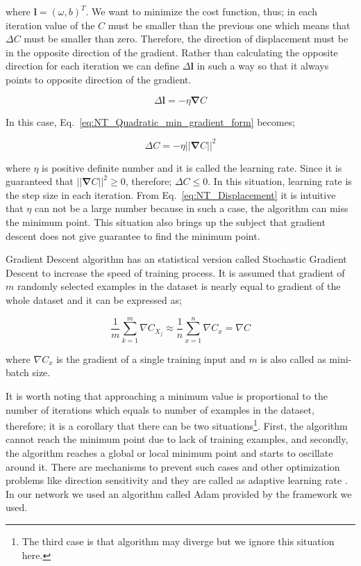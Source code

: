 \documentclass[a4paper,times,12pt]{article}
\begin{document}
\noindent where $\boldsymbol{l} = (\omega, b)^T$. We want to minimize the cost function, thus; in each iteration value of the $C$ must be smaller than the previous one which means that $\Delta{C}$ must be smaller than zero. Therefore, the direction of displacement must be in the opposite direction of the gradient. Rather than calculating the opposite direction for each iteration we can define $\Delta{\boldsymbol{l}}$ in such a way so that it always points to opposite direction of the gradient.

\begin{equation}
\label{eq:NT_learning_rate}
\Delta{\boldsymbol{l}} = -\eta\boldsymbol{\nabla}C
\end{equation}

\noindent In this case, Eq.~\eqref{eq:NT_Quadratic_min_gradient_form} becomes;

\begin{equation}
\label{eq:NT_Displacement}
\Delta{C} = -\eta ||\boldsymbol{\nabla}{C}||^2
\end{equation}

\noindent where $\eta$ is positive definite number and it is called the learning rate. Since it is guaranteed that $||\boldsymbol{\nabla}{C}||^2 \geq 0$, therefore; $\Delta{C} \leq 0$. In this situation, learning rate is the step size in each iteration. From Eq.~\eqref{eq:NT_Displacement} it is intuitive that $\eta$ can not be a large number because in such a case, the algorithm can miss the minimum point. This situation also brings up the subject that gradient descent does not give guarantee to find the minimum point.

Gradient Descent algorithm has an statistical version called Stochastic Gradient Descent to increase the speed of training process. It is assumed that gradient of  $m$ randomly selected examples in the dataset is nearly equal to gradient of the whole dataset and it can be expressed as;

\begin{equation}
\label{eq:NT_Stochastic}
\frac{1}{m} \sum\limits_{k = 1}^{m} \nabla{C_{X_j}} \approx \frac{1}{n}\sum\limits_{x = 1}^{n} \nabla{C_{x}} = \nabla{C}
\end{equation}

\noindent where $\nabla{C_x}$ is the gradient of a single training input and $m$ is also called as mini-batch size.

It is worth noting that approaching a minimum value is proportional to the number of iterations which equals to number of examples in the dataset, therefore; it is a corollary that there can be two situations\footnote{The third case is that algorithm may diverge but we ignore this situation here.}. First, the algorithm cannot reach the minimum point due to lack of training examples, and secondly, the algorithm reaches a global or local minimum point and starts to oscillate around it\cite{zeiler2012adadelta}. There are mechanisms to prevent such cases and other optimization problems like direction sensitivity and they are called as adaptive learning rate \cite{mills2017deep}. In our network we used an algorithm called Adam \cite{kingma2014adam} provided by the framework we used.  
\end{document}
